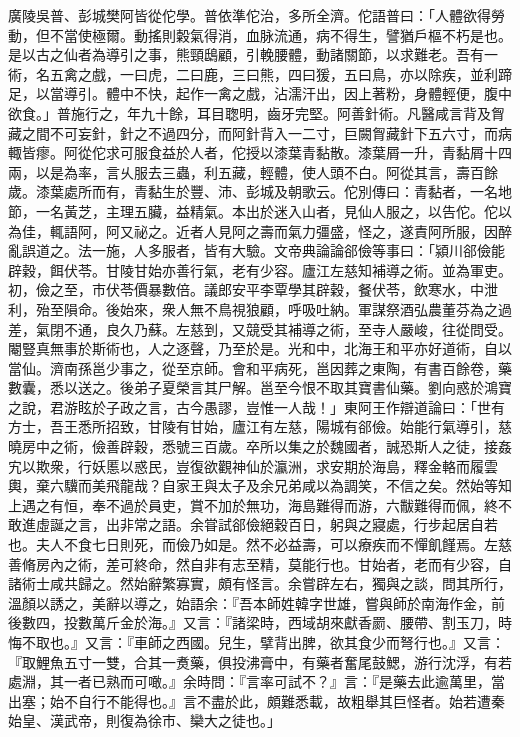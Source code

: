 \begin{pinyinscope}
廣陵吳普、彭城樊阿皆從佗學。普依準佗治，多所全濟。佗語普曰：「人體欲得勞動，但不當使極爾。動搖則糓氣得消，血脉流通，病不得生，譬猶戶樞不朽是也。是以古之仙者為導引之事，熊頸鴟顧，引輓腰體，動諸關節，以求難老。吾有一術，名五禽之戲，一曰虎，二曰鹿，三曰熊，四曰猨，五曰鳥，亦以除疾，並利蹄足，以當導引。體中不快，起作一禽之戲，沾濡汗出，因上著粉，身體輕便，腹中欲食。」普施行之，年九十餘，耳目聦明，齒牙完堅。阿善針術。凡醫咸言背及胷藏之間不可妄針，針之不過四分，而阿針背入一二寸，巨闕胷藏針下五六寸，而病輙皆瘳。阿從佗求可服食益於人者，佗授以漆葉青黏散。漆葉屑一升，青黏屑十四兩，以是為率，言乆服去三蟲，利五藏，輕體，使人頭不白。阿從其言，壽百餘歲。漆葉處所而有，青黏生於豐、沛、彭城及朝歌云。佗別傳曰：青黏者，一名地節，一名黃芝，主理五臟，益精氣。本出於迷入山者，見仙人服之，以告佗。佗以為佳，輒語阿，阿又祕之。近者人見阿之壽而氣力彊盛，怪之，遂責阿所服，因醉亂誤道之。法一施，人多服者，皆有大驗。文帝典論論郤儉等事曰：「潁川郤儉能辟穀，餌伏苓。甘陵甘始亦善行氣，老有少容。廬江左慈知補導之術。並為軍吏。初，儉之至，巿伏苓價暴數倍。議郎安平李覃學其辟穀，餐伏苓，飲寒水，中泄利，殆至隕命。後始來，衆人無不鳥視狼顧，呼吸吐納。軍謀祭酒弘農董芬為之過差，氣閉不通，良久乃蘇。左慈到，又競受其補導之術，至寺人嚴峻，往從問受。閹豎真無事於斯術也，人之逐聲，乃至於是。光和中，北海王和平亦好道術，自以當仙。濟南孫邕少事之，從至京師。會和平病死，邕因葬之東陶，有書百餘卷，藥數囊，悉以送之。後弟子夏榮言其尸解。邕至今恨不取其寶書仙藥。劉向惑於鴻寶之說，君游眩於子政之言，古今愚謬，豈惟一人哉！」東阿王作辯道論曰：「世有方士，吾王悉所招致，甘陵有甘始，廬江有左慈，陽城有郤儉。始能行氣導引，慈曉房中之術，儉善辟穀，悉號三百歲。卒所以集之於魏國者，誠恐斯人之徒，接姦宄以欺衆，行妖慝以惑民，豈復欲觀神仙於瀛洲，求安期於海島，釋金輅而履雲輿，棄六驥而美飛龍哉？自家王與太子及余兄弟咸以為調笑，不信之矣。然始等知上遇之有恒，奉不過於員吏，賞不加於無功，海島難得而游，六黻難得而佩，終不敢進虛誕之言，出非常之語。余甞試郤儉絕穀百日，躬與之寢處，行步起居自若也。夫人不食七日則死，而儉乃如是。然不必益壽，可以療疾而不憚飢饉焉。左慈善脩房內之術，差可終命，然自非有志至精，莫能行也。甘始者，老而有少容，自諸術士咸共歸之。然始辭繁寡實，頗有怪言。余嘗辟左右，獨與之談，問其所行，溫顏以誘之，美辭以導之，始語余：『吾本師姓韓字世雄，嘗與師於南海作金，前後數四，投數萬斤金於海。』又言：『諸梁時，西域胡來獻香罽、腰帶、割玉刀，時悔不取也。』又言：『車師之西國。兒生，擘背出脾，欲其食少而弩行也。』又言：『取鯉魚五寸一雙，合其一煑藥，俱投沸膏中，有藥者奮尾鼓鰓，游行沈浮，有若處淵，其一者已熟而可噉。』余時問：『言率可試不？』言：『是藥去此逾萬里，當出塞；始不自行不能得也。』言不盡於此，頗難悉載，故粗舉其巨怪者。始若遭秦始皇、漢武帝，則復為徐巿、欒大之徒也。」


\end{pinyinscope}